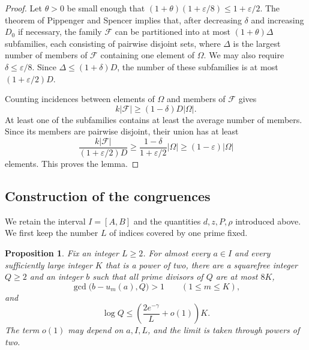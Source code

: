\documentclass[11pt,reqno]{amsart}
\numberwithin{equation}{section}
\newtheorem{proposition}[theorem]{Proposition}
\begin{document}
\begin{proof}
Let $\theta>0$ be small enough that $(1+\theta)(1+\varepsilon/8)\le1+\varepsilon/2$. The theorem of Pippenger and Spencer \cite{PippengerSpencer} implies that, after decreasing $\delta$ and increasing $D_0$ if necessary, the family $\mathcal F$ can be partitioned into at most $(1+\theta)\Delta$ subfamilies, each consisting of pairwise disjoint sets, where $\Delta$ is the largest number of members of $\mathcal F$ containing one element of $\Omega$. We may also require $\delta\le\varepsilon/8$. Since $\Delta\le(1+\delta)D$, the number of these subfamilies is at most $(1+\varepsilon/2)D$.

Counting incidences between elements of $\Omega$ and members of $\mathcal F$ gives
\[
 k|\mathcal F|\ge(1-\delta)D|\Omega|.
\]
At least one of the subfamilies contains at least the average number of members. Since its members are pairwise disjoint, their union has at least
\[
 \frac{k|\mathcal F|}{(1+\varepsilon/2)D}
 \ge\frac{1-\delta}{1+\varepsilon/2}|\Omega|
 \ge(1-\varepsilon)|\Omega|
\]
elements. This proves the lemma.
\end{proof}

\subsection{Construction of the congruences}

We retain the interval $I=[A,B]$ and the quantities $d,z,P,\rho$ introduced above. We first keep the number $L$ of indices covered by one prime fixed.

\begin{proposition}\label{prop-prime-fixed-L}
Fix an integer $L\ge2$. For almost every $a\in I$ and every sufficiently large integer $K$ that is a power of two, there are a squarefree integer $Q\ge2$ and an integer $b$ such that all prime divisors of $Q$ are at most $8K$,
\[
 \gcd\bigl(b-u_m(a),Q\bigr)>1\qquad(1\le m\le K),
\]
and
\begin{equation}\label{eq-prime-fixed-L-size}
 \log Q\le\left(\frac{2e^{-\gamma}}L+o(1)\right)K.
\end{equation}
The term $o(1)$ may depend on $a,I,L$, and the limit is taken through powers of two.
\end{proposition}
\end{document}
